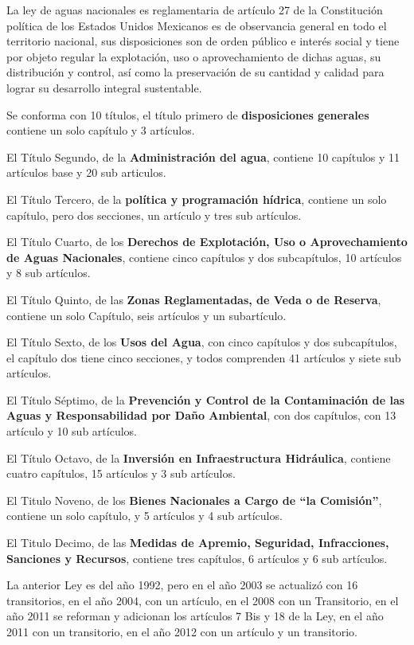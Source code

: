 La ley de aguas nacionales es reglamentaria de artículo 27 de la Constitución
política de los Estados Unidos Mexicanos es de observancia general en todo el territorio
nacional, sus disposiciones son de orden público e interés social y tiene por objeto
regular la explotación, uso o aprovechamiento de dichas aguas, su distribución y
control, así como la preservación de su cantidad y calidad para lograr su desarrollo
integral sustentable.

Se conforma con 10 títulos, el título primero de \textbf{disposiciones generales} contiene
un solo capítulo y 3 artículos.

El Título Segundo, de la \textbf{Administración del agua}, contiene 10 capítulos y 11
artículos base y 20 sub articulos.

El Título Tercero, de la \textbf{política y programación hídrica}, contiene un solo capítulo,
pero dos secciones, un artículo y tres sub artículos.

El Título Cuarto, de los \textbf{Derechos de Explotación, Uso o Aprovechamiento de
	Aguas Nacionales}, contiene cinco capítulos y dos subcapítulos, 10 artículos y 8
sub artículos.

El Título Quinto, de las \textbf{Zonas Reglamentadas, de Veda o de Reserva}, contiene
un solo Capítulo, seis artículos y un subartículo.

El Título Sexto, de los \textbf{Usos del Agua}, con cinco capítulos y dos subcapítulos, el
capítulo dos tiene cinco secciones, y todos comprenden 41 artículos y siete
sub artículos.

El Título Séptimo, de la \textbf{Prevención y Control de la Contaminación de las Aguas y
	Responsabilidad por Daño Ambiental}, con dos capítulos, con 13 artículo y 10
sub artículos.

El Título Octavo, de la \textbf{Inversión en Infraestructura Hidráulica}, contiene cuatro
capítulos, 15 artículos y 3 sub artículos.

El Titulo Noveno, de los \textbf{Bienes Nacionales a Cargo de ``la Comisión''}, contiene
un solo capítulo, y 5 artículos y 4 sub artículos.

El Titulo Decimo, de las \textbf{Medidas de Apremio, Seguridad, Infracciones, Sanciones
	y Recursos}, contiene tres capítulos, 6 artículos y 6 sub artículos.

La anterior Ley es del año 1992, pero en el año 2003 se actualizó con 16
transitorios, en el año 2004, con un artículo, en el 2008 con un Transitorio, en el año
2011 se reforman y adicionan los artículos 7 Bis y 18 de la Ley, en el año 2011 con un
transitorio, en el año 2012 con un artículo y un transitorio.

